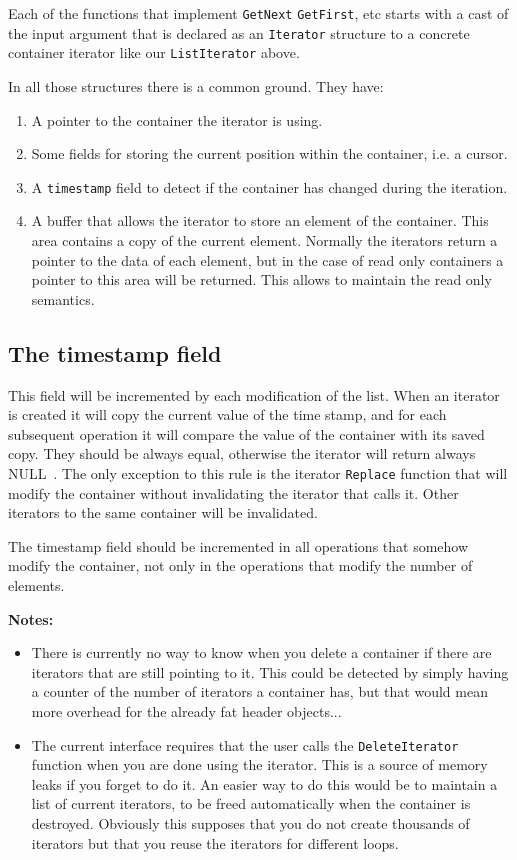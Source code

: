 \documentclass[12pt,a4paper]{memoir} %
\newif\iftth
\newcommand{\notes}{
\par \noindent \textbf{Notes:}\par\noindent}
\newcommand{\Null}{{\iftth \ NULL \else \footnotesize NULL\  \fi}}
\begin{document}
{{\begin{itemize}
Each of the functions that implement \texttt{GetNext} \texttt{GetFirst}, etc starts with a cast of the input argument that is declared as an 
\texttt{Iterator} structure to a concrete container iterator like our \texttt{ListIterator} above.

In all those structures there is a common ground. They have:
\begin{enumerate}
\item A pointer to the container the iterator is using.
\item Some fields for storing the current position within the container, i.e. a cursor.
\item A \texttt{timestamp} field to detect if the container has changed during the iteration.
\item A buffer that allows the iterator to store an element of the container. This area contains a copy of the current element. Normally the
iterators return a pointer to the data of each element, but in the case of read only containers a pointer to this area will be returned. 
This allows to maintain the read only semantics.
\end{enumerate}
\end{itemize}
\subsection{The timestamp field}
This field will be incremented by each modification of the list. When an iterator is created it will copy the current value of the time stamp, and for
each subsequent operation it will compare the value of the container with its saved copy. They should be always equal, otherwise the iterator will
return always \Null. The only exception to this rule is the iterator \verb,Replace, function that will modify the container without invalidating
the iterator that calls it. Other iterators to the same container will be invalidated.

The timestamp field should be incremented in all operations that somehow modify the container, not only in the operations that modify the number of 
elements.
\notes{Implementation issues}
\begin{itemize}
\item
There is currently no way to know when you delete a container if there are iterators that are still
pointing to it. This could be detected by simply having a counter of the number of iterators a container has, but that would mean more overhead for the 
already fat header objects...
\item The current interface requires that the user calls the \verb,DeleteIterator, function when you are done using the iterator. This is
a source of memory leaks if you forget
to do it. An easier way to do this would be to maintain a list of current iterators, to be freed automatically when the container is 
destroyed. Obviously this supposes that you do not create thousands of iterators but that you reuse the iterators for different loops.
\end{itemize}
}}
\end{document}
